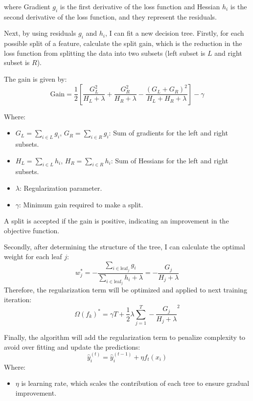 \documentclass[
]{article}
\providecommand{\tightlist}{%
  \setlength{\itemsep}{0pt}\setlength{\parskip}{0pt}}
\begin{document}
where Gradient \(g_i\) is the first derivative of the loss function and
Hessian \(h_i\) is the second derivative of the loss function, and they
represent the residuals.

Next, by using residuals \(g_i\) and \(h_i\), I can fit a new decision
tree. Firstly, for each possible split of a feature, calculate the split
gain, which is the reduction in the loss function from splitting the
data into two subsets (left subset is \(L\) and right subset is \(R\)).

The gain is given by: \[
\text{Gain} = \frac{1}{2} \left[ \frac{G_L^2}{H_L + \lambda} + \frac{G_R^2}{H_R + \lambda} - \frac{(G_L + G_R)^2}{H_L + H_R + \lambda} \right] - \gamma
\]

Where:

\begin{itemize}
\item
  \(G_L = \sum_{i \in L} g_i\), \(G_R = \sum_{i \in R} g_i\): Sum of
  gradients for the left and right subsets.
\item
  \(H_L = \sum_{i \in L} h_i\), \(H_R = \sum_{i \in R} h_i\): Sum of
  Hessians for the left and right subsets.
\item
  \(\lambda\): Regularization parameter.
\item
  \(\gamma\): Minimum gain required to make a split.
\end{itemize}

A split is accepted if the gain is positive, indicating an improvement
in the objective function.

Secondly, after determining the structure of the tree, I can calculate
the optimal weight for each leaf \(j\): \[
w_j^* = -\frac{\sum_{i \in \text{leaf}_j} g_i}{\sum_{i \in \text{leaf}_j} h_i + \lambda} = -\frac{G_j}{H_j + \lambda}
\] Therefore, the regularization term will be optimized and applied to
next training iteration: \[
\Omega(f_k)^* = \gamma T + \frac{1}{2} \lambda \sum_{j=1}^T -\frac{G_j}{H_j + \lambda}^2
\]

Finally, the algorithm will add the regularization term to penalize
complexity to avoid over fitting and update the predictions: \[
\hat{y}_i^{(t)} = \hat{y}_i^{(t-1)} + \eta f_t(x_i)
\] Where:

\begin{itemize}
\tightlist
\item
  \(\eta\) is learning rate, which scales the contribution of each tree
  to ensure gradual improvement.
\end{itemize}
\end{document}
